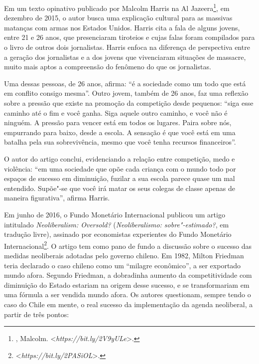 Em um texto opinativo publicado por Malcolm Harris na Al Jazeera\footnote{,
  Malcolm.
  \textless{}\emph{https://bit.ly/2V9yULe}\textgreater{}.},
em dezembro de 2015, o autor busca uma explicação cultural para as
massivas matanças com armas nos Estados Unidos. Harris cita a fala de
alguns jovens, entre 21 e 26 anos, que presenciaram tiroteios e cujas
falas foram compilados para o livro de outros dois jornalistas. Harris
enfoca na diferença de perspectiva entre a geração dos jornalistas e a
dos jovens que vivenciaram situações de massacre, muito mais aptos a
compreensão do fenômeno do que os jornalistas.

Uma dessas pessoas, de 26 anos, afirma: ``é a sociedade como um
todo que está em conflito consigo mesma''. Outro jovem, também de 26
anos, faz uma reflexão sobre a pressão que existe na promoção da
competição desde pequenos: ``siga esse caminho até o fim e você ganha.
Siga aquele outro caminho, e você não é ninguém. A pressão para vencer
está em todos os lugares. Paira sobre nós, empurrando para baixo, desde
a escola. A sensação é que você está em uma batalha pela sua
sobrevivência, mesmo que você tenha recursos
financeiros''.

O autor do artigo conclui, evidenciando a relação entre
competição, medo e violência: ``em uma sociedade que opõe cada criança
com o mundo todo por espaços de sucesso em diminuição, fuzilar a sua
escola parece quase um mal entendido. Supõe"-se que você irá matar os
seus colegas de classe apenas de maneira figurativa'', afirma
Harris.

\asterisc

Em junho de 2016, o Fundo Monetário Internacional publicou um artigo
intitulado \emph{Neoliberalism: Oversold?} (\emph{Neoliberalismo:
sobre"-estimado?}, em tradução livre), assinado por economistas
experientes do Fundo Monetário Internacional\footnote{\textless{}\emph{https://bit.ly/2PASiOL}\textgreater{}.}.
O artigo tem como pano de fundo a discussão sobre o sucesso das medidas
neoliberais adotadas pelo governo chileno. Em 1982, Milton Friedman
teria declarado o caso chileno como um ``milagre econômico'', a ser
exportado mundo afora. Segundo Friedman, a dobradinha aumento da
competitividade com diminuição do Estado estariam na origem desse
sucesso, e se transformariam em uma fórmula a ser vendida mundo afora.
Os autores questionam, sempre tendo o caso do Chile em mente, o real
sucesso da implementação da agenda neoliberal, a partir de três pontos:

